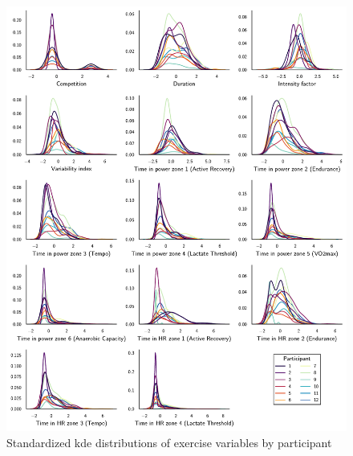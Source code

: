 \documentclass[11pt,a4paper]{article}
\begin{document}
\begin{figure}
    \centering
    \includegraphics[width=\textwidth]{figure/distributions.pdf}
    \caption{Standardized \gls{kde} distributions of exercise variables by participant}
    \label{fig:distributions}
\end{figure}
\end{document}
